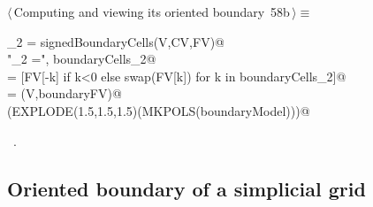 \documentclass[11pt,oneside]{article}    %
\begin{document}
\begin{flushleft} \small \label{scrap104}
\protect{}$\langle\,$Computing and viewing its oriented boundary\nobreak\ {\footnotesize 58b}$\,\rangle\equiv$
\vspace{-1ex}
\begin{list}{}{} \item
\mbox{}\verb@boundaryCells_2 = signedBoundaryCells(V,CV,FV)@\\
\mbox{}\verb@print "\nboundaryCells_2 =\n", boundaryCells_2@\\
\mbox{}\verb@boundaryFV = [FV[-k] if k<0 else swap(FV[k]) for k in boundaryCells_2]@\\
\mbox{}\verb@boundaryModel = (V,boundaryFV)@\\
\mbox{}\verb@VIEW(EXPLODE(1.5,1.5,1.5)(MKPOLS(boundaryModel)))@\\
\mbox{}\verb@@{\NWsep}
\end{list}
\vspace{-1ex}
\footnotesize\addtolength{\baselineskip}{-1ex}
\begin{list}{}{\setlength{\itemsep}{-\parsep}\setlength{\itemindent}{-\leftmargin}}
\item \NWtxtMacroRefIn\ .
\end{list}
\end{flushleft}

\subsection{Oriented boundary of a simplicial grid}
\end{document}
